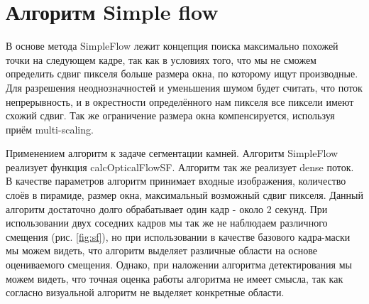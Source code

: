 \documentclass[times]{itmo-student-thesis}
\begin{document}
\section{Алгоритм Simple flow}
В основе метода SimpleFlow\cite{sf} лежит концепция поиска максимально похожей точки на следующем кадре, так как в условиях того, что мы не сможем определить сдвиг  пикселя больше размера окна, по которому ищут производные. Для разрешения неоднозначностей и уменьшения шумом будет считать, что поток непрерывность, и в окрестности определённого нам пикселя все пиксели имеют схожий сдвиг. Так же ограничение размера окна компенсируется, используя приём multi-scaling.

Применением алгоритм к задаче сегментации камней. Алгоритм SimpleFlow реализует функция calcOpticalFlowSF. Алгоритм так же реализует dense поток.  В качестве параметров алгоритм принимает входные изображения, количество слоёв в пирамиде, размер окна, максимальный возможный сдвиг пикселя. Данный алгоритм достаточно долго обрабатывает один кадр - около 2 секунд. При использовании двух соседних кадров мы так же не наблюдаем различного смещения (рис. \ref{fig:sf}), но при использовании в качестве базового кадра-маски мы можем видеть, что алгоритм выделяет различные области на основе оцениваемого смещения. Однако, при наложении алгоритма детектирования мы можем видеть, что точная оценка работы алгоритма не имеет смысла, так как согласно визуальной алгоритм не выделяет конкретные области.
\end{document}

